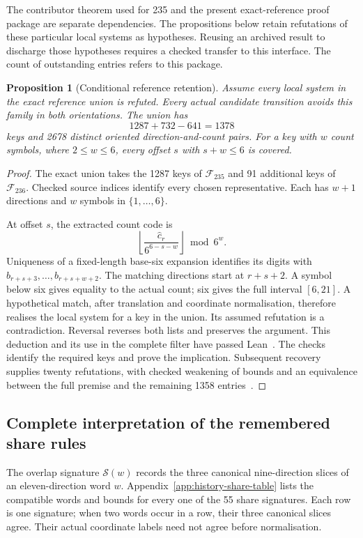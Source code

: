 \documentclass[11pt,a4paper]{article}
\newtheorem{proposition}[theorem]{Proposition}
\theoremstyle{definition}
\theoremstyle{remark}
\begin{document}
The contributor theorem used for 235 and the present exact-reference proof
package are separate dependencies. The propositions below retain
refutations of these particular local systems as hypotheses. Reusing an
archived result to discharge those hypotheses requires a checked transfer
to this interface. The count of outstanding entries refers to this package.

\begin{proposition}[Conditional reference retention]\label{prop:reference-union-retention}
Assume every local system in the exact reference union is refuted. Every
actual candidate transition avoids this family in both orientations. The union has
\[
1287+732-641=1378
\]
keys and 2678 distinct oriented direction-and-count pairs. For a key with
$w$ count symbols, where $2\le w\le6$, every offset $s$ with $s+w\le6$
is covered.
\end{proposition}
\begin{proof}
The exact union takes the 1287 keys of $\mathcal F_{235}$ and 91 additional
keys of $\mathcal F_{236}$. Checked source indices identify every chosen
representative. Each has $w+1$ directions and $w$ symbols in $\{1,\ldots,6\}$.

At offset $s$, the extracted count code is
\[
\left\lfloor\frac{\widehat c_r}{6^{6-s-w}}\right\rfloor\bmod6^w.
\]
Uniqueness of a fixed-length base-six expansion identifies its digits with
$b_{r+s+3},\ldots,b_{r+s+w+2}$. The matching directions start at $r+s+2$.
A symbol below six gives equality to the actual count; six gives the full
interval $[6,21]$. A hypothetical match, after translation and coordinate
normalisation, therefore realises the local system for a key in the union.
Its assumed refutation is a contradiction. Reversal reverses both lists and
preserves the argument. This deduction and its use in the complete filter
have passed Lean~\cite{referenceunionarchive}. The checks identify the required
keys and prove the implication. Subsequent recovery supplies twenty
refutations, with checked weakening of bounds and an equivalence between
the full premise and the remaining 1358 entries~\cite{recoveryarchive,pair012032archive}.
\end{proof}

\subsection{Complete interpretation of the remembered share rules}\label{sec:history-share-complete}
The overlap signature $\mathcal S(w)$ records the three canonical nine-direction
slices of an eleven-direction word $w$. Appendix~\ref{app:history-share-table}
lists the compatible words and bounds for every one of the 55 share signatures.
Each row is one signature; when two words occur in a row, their three canonical
slices agree. Their actual coordinate labels need not agree before normalisation.
\end{document}
